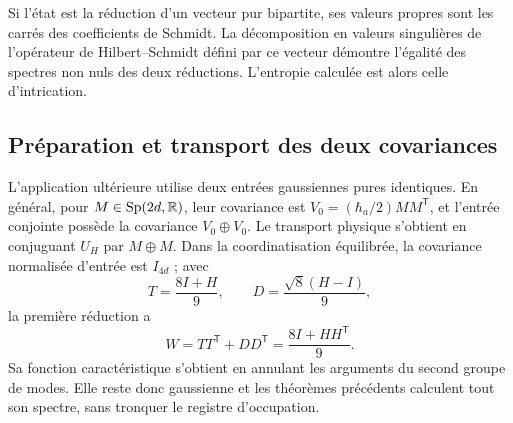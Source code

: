 Si l’état est la réduction d’un vecteur pur bipartite, ses
valeurs propres sont les carrés des coefficients de Schmidt.
La décomposition en valeurs singulières de l’opérateur de Hilbert--Schmidt défini
par ce vecteur démontre l’égalité des spectres non nuls des deux
réductions. L’entropie calculée est alors celle d’intrication.

\subsection{Préparation et transport des deux covariances}
L’application ultérieure utilise deux entrées gaussiennes pures identiques.
En général, pour \(M\in\operatorname{Sp}(2d,\mathbb R)\), leur covariance est
\(V_0=(\hbar_a/2)MM^{\mathsf T}\), et l’entrée conjointe possède la
covariance \(V_0\oplus V_0\). Le transport physique s’obtient
en conjuguant \(U_H\) par \(M\oplus M\). Dans la coordinatisation équilibrée,
la covariance normalisée d’entrée est \(I_{4d}\) ; avec
\[
 T=\frac{8I+H}{9},\qquad D=\frac{\sqrt8(H-I)}9,
\]
la première réduction a
\[
 W=TT^{\mathsf T}+DD^{\mathsf T}=\frac{8I+HH^{\mathsf T}}9.
\]
Sa fonction caractéristique s’obtient en annulant les arguments du
second groupe de modes. Elle reste donc gaussienne et les théorèmes
précédents calculent tout son spectre, sans tronquer le registre d’occupation.
